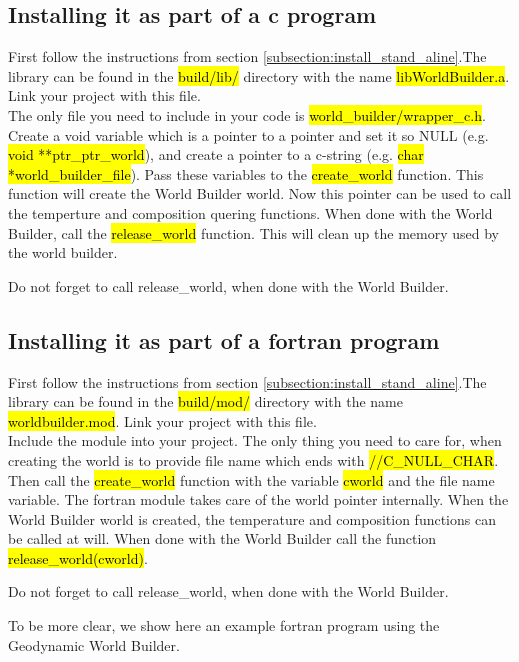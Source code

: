\documentclass{book}
\newcommand{\GWB}{{Geodynamic World Builder}}
\newcommand{\WB}{{World Builder}}
\begin{document}
\subsection{Installing it as part of a c program}
First follow the instructions from section \ref{subsection:install_stand_aline}.The library can be found in the \hl{build/lib/} directory with the name \hl{libWorldBuilder.a}. Link your project with this file. 
\\
The only file you need to include in your code is \hl{world\_builder/wrapper\_c.h}. Create a void variable which is a pointer to a pointer and set it so NULL (e.g. \hl{void **ptr\_ptr\_world}), and create a pointer to a c-string (e.g. \hl{char *world\_builder\_file}). Pass these variables to the \hl{create\_world} function. This function will create the \WB{} world. Now this pointer can be used to call the temperture and composition quering functions. When done with the \WB{}, call the \hl{release\_world} function. This will clean up the memory used by the world builder.
\begin{remark}
Do not forget to call release\_world, when done with the \WB{}.
\end{remark}

\subsection{Installing it as part of a fortran program}
First follow the instructions from section \ref{subsection:install_stand_aline}.The library can be found in the \hl{build/mod/} directory with the name \hl{worldbuilder.mod}. Link your project with this file. 
\\
Include the module into your project. The only thing you need to care for, when creating the world is to provide file name which ends with \hl{//C\_NULL\_CHAR}. Then call the \hl{create\_world} function with the variable \hl{cworld} and the file name variable. The fortran module takes care of the world pointer internally. When the \WB{} world is created, the temperature and composition functions can be called at will. When done with the \WB{} call the function \hl{release\_world(cworld)}. 
\begin{remark}
Do not forget to call release\_world, when done with the \WB{}.
\end{remark}
To be more clear, we show here an example fortran program using the \GWB{}. 
\end{document}
